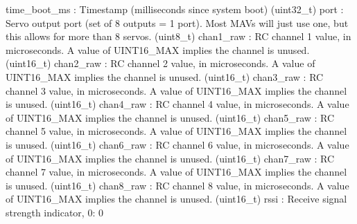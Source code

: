 \begin{DoxyVerb}
\begin{DoxyVerb}
\begin{DoxyVerb}
\begin{DoxyVerb}
\begin{DoxyVerb}
\begin{DoxyVerb}
time_boot_ms              : Timestamp (milliseconds since system boot) (uint32_t)
port                      : Servo output port (set of 8 outputs = 1 port). Most MAVs will just use one, but this allows for more than 8 servos. (uint8_t)
chan1_raw                 : RC channel 1 value, in microseconds. A value of UINT16_MAX implies the channel is unused. (uint16_t)
chan2_raw                 : RC channel 2 value, in microseconds. A value of UINT16_MAX implies the channel is unused. (uint16_t)
chan3_raw                 : RC channel 3 value, in microseconds. A value of UINT16_MAX implies the channel is unused. (uint16_t)
chan4_raw                 : RC channel 4 value, in microseconds. A value of UINT16_MAX implies the channel is unused. (uint16_t)
chan5_raw                 : RC channel 5 value, in microseconds. A value of UINT16_MAX implies the channel is unused. (uint16_t)
chan6_raw                 : RC channel 6 value, in microseconds. A value of UINT16_MAX implies the channel is unused. (uint16_t)
chan7_raw                 : RC channel 7 value, in microseconds. A value of UINT16_MAX implies the channel is unused. (uint16_t)
chan8_raw                 : RC channel 8 value, in microseconds. A value of UINT16_MAX implies the channel is unused. (uint16_t)
rssi                      : Receive signal strength indicator, 0: 0%
 \mbox{\label{classpymavlink_1_1dialects_1_1v10_1_1MAVLink_a738d27c09050a6681143487337a142b4}} 

\end{DoxyVerb}
\end{DoxyVerb}
\end{DoxyVerb}
\end{DoxyVerb}
\end{DoxyVerb}
\end{DoxyVerb}
